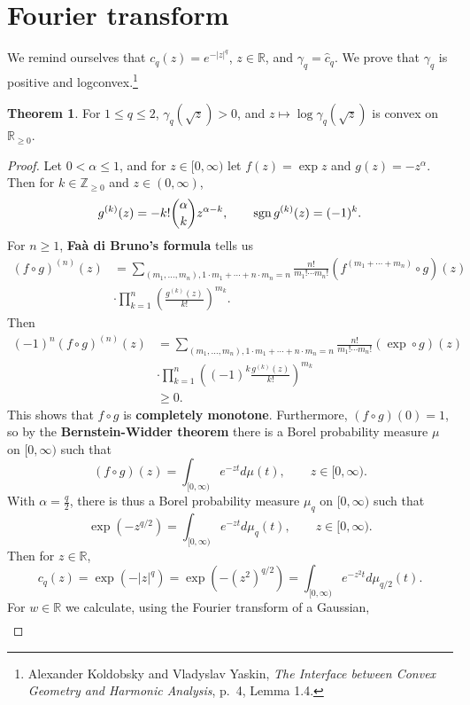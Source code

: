 \documentclass{article}
\newcommand{\sgn}{\ensuremath\mathrm{sgn}\,}
\theoremstyle{definition}
\newtheorem{theorem}{Theorem}
\theoremstyle{definition}
\begin{document}
\section{Fourier transform}
We remind ourselves that
$c_q(z) = e^{-|z|^q}$, $z \in \mathbb{R}$, 
and  $\gamma_q = \widehat{c}_q$.
We prove that $\gamma_q$ is positive and logconvex.\footnote{Alexander Koldobsky and
Vladyslav Yaskin, {\em The Interface between Convex Geometry and Harmonic Analysis},
p.~4, Lemma 1.4.}

\begin{theorem}
For $1 \leq q \leq 2$, $\gamma_q (\sqrt{z}) > 0$, and
$z \mapsto \log \gamma_q (\sqrt{z})$
is convex on $\mathbb{R}_{\geq 0}$.  
\end{theorem}
\begin{proof}
Let $0<\alpha \leq 1$, and for $z \in [0,\infty)$ let
 $f(z) = \exp z$ and $g(z) = -z^\alpha$. Then for $k \in \mathbb{Z}_{\geq 0}$ and
$z \in (0,\infty)$,
\[
g^{(k)}(z) = -k! \binom{\alpha}{k} z^{\alpha-k},
\qquad \sgn g^{(k)}(z) = (-1)^k.
\]
For $n \geq 1$,
\textbf{Fa\`a di Bruno's formula} tells us
\begin{align*}
(f \circ g)^{(n)}(z) &= \sum_{(m_1,\ldots,m_n), 1\cdot m_1+\cdots+n \cdot m_n=n} \frac{n!}{m_1! \cdots m_n!} (f^{(m_1+\cdots+m_n)} 
\circ g)(z)\\
& \cdot \prod_{k=1}^n \left( \frac{g^{(k)}(z)}{k!} \right)^{m_k}.
\end{align*}
Then 
\begin{align*}
(-1)^n (f \circ g)^{(n)}(z) &= \sum_{(m_1,\ldots,m_n), 1\cdot m_1+\cdots+n \cdot m_n=n} \frac{n!}{m_1! \cdots m_n!} 
(\exp \circ g)(z)\\
&\cdot  \prod_{k=1}^n \left( (-1)^k \frac{ g^{(k)}(z)}{k!} \right)^{m_k}\\
&\geq 0.
\end{align*}
This shows that $f \circ g$ is \textbf{completely monotone}. Furthermore,
$(f \circ g)(0) = 1$, so by the \textbf{Bernstein-Widder theorem}
there is a Borel probability measure $\mu$ on $[0,\infty)$ such that
\[
(f \circ g)(z) = \int_{[0,\infty)} e^{-zt} d\mu(t),\qquad z \in [0,\infty).
\]
With $\alpha= \frac{q}{2}$, there is thus a Borel probability measure $\mu_q$ on $[0,\infty)$ 
such that
\[
\exp(-z^{q/2}) = \int_{[0,\infty)} e^{-zt} d\mu_q(t),\qquad z \in [0,\infty).
\]
Then for $z \in \mathbb{R}$,
\[
c_q(z) = \exp(-|z|^q) = \exp(- (z^2)^{q/2}) =   \int_{[0,\infty)} e^{-z^2 t} d\mu_{q/2}(t).
\]
For $w \in \mathbb{R}$ we calculate, using the Fourier transform of a Gaussian,
\begin{align*}

\end{align*}
\end{proof}
\end{document}
